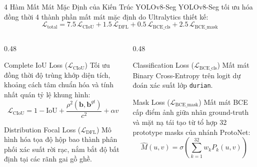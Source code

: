 \documentclass[aspectratio=169, 10pt]{beamer}
\begin{document}
\begin{frame}{4 Hàm Mất Mát Mặc Định của Kiến Trúc YOLOv8-Seg}
\footnotesize
YOLOv8-Seg tối ưu hóa đồng thời 4 thành phần mất mát mặc định do Ultralytics thiết kế:
\begin{equation*}
\mathcal{L}_{\text{total}} = 7.5\,\mathcal{L}_{\text{CIoU}} + 1.5\,\mathcal{L}_{\text{DFL}} + 0.5\,\mathcal{L}_{\text{BCE\_cls}} + 2.5\,\mathcal{L}_{\text{BCE\_mask}}
\end{equation*}

\begin{columns}[T]
\begin{column}{0.48\textwidth}
    \begin{block}{Complete IoU Loss ($\mathcal{L}_{\text{CIoU}}$) \cite{zheng2020ciou}}
    \scriptsize
    Tối ưu đồng thời độ trùng khớp diện tích, khoảng cách tâm chuẩn hóa và tính nhất quán tỷ lệ khung hình:
    $$\mathcal{L}_{\text{CIoU}} = 1 - \text{IoU} + \frac{\rho^2(\mathbf{b}, \mathbf{b}^{gt})}{c^2} + \alpha v$$
    \end{block}
    \begin{block}{Distribution Focal Loss ($\mathcal{L}_{\text{DFL}}$) \cite{li2020generalized}}
    \scriptsize
    Mô hình hóa tọa độ hộp bao thành phân phối xác suất rời rạc, nắm bắt độ bất định tại các rãnh gai gồ ghề.
    \end{block}
\end{column}
\begin{column}{0.48\textwidth}
    \begin{block}{Classification Loss ($\mathcal{L}_{\text{BCE\_cls}}$)}
    \scriptsize
    Mất mát Binary Cross-Entropy trên logit dự đoán xác suất lớp \texttt{durian}.
    \end{block}
    \begin{block}{Mask Loss ($\mathcal{L}_{\text{BCE\_mask}}$)}
    \scriptsize
    Mất mát BCE cấp điểm ảnh giữa nhãn ground-truth và mặt nạ tái tạo từ tổ hợp 32 prototype masks của nhánh ProtoNet:
    $$\hat{M}(u, v) = \sigma\left(\sum_{k=1}^{32} w_k P_k(u, v)\right)$$
    \end{block}
\end{column}
\end{columns}
\end{frame}
\end{document}

